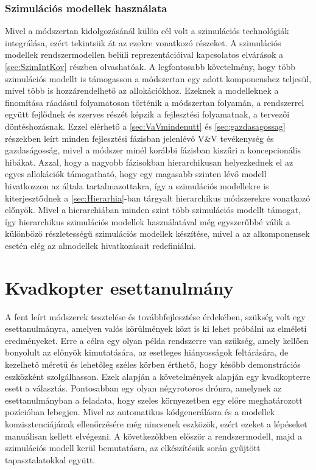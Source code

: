         \subsubsection{Szimulációs modellek használata}
        Mivel a módszertan kidolgozásánál külön cél volt a szimulációs technológiák integrálása, ezért tekintsük át az ezekre vonatkozó részeket.
        A szimulációs modellek rendszermodellen belüli reprezentációival kapcsolatos elvárások a \ref{sec:SzimIntKov} részben olvashatóak. A legfontosabb követelmény, hogy több szimulációs modellt is támogasson a módszertan egy adott komponenshez teljesül, mivel több is hozzárendelhető az allokációkhoz.
        Ezeknek a modelleknek a finomítása ráadásul folyamatosan történik a módszertan folyamán, a rendszerrel együtt fejlődnek és szerves részét képzik a fejlesztési folyamatnak, a tervezői döntéshozásnak.
        Ezzel elérhető a \ref{sec:VaVmindenutt} és \ref{sec:gazdasagossag} részekben leírt minden fejlesztési fázisban jelenlévő V\&V tevékenység és gazdaságosság, mivel a módszer minél korábbi fázisban kiszűri a koncepcionális hibákat.
        Azzal, hogy a nagyobb fázisokban hierarchikusan helyezkednek el az egyes allokációk támogatható, hogy egy magasabb szinten lévő modell hivatkozzon az általa tartalmazottakra, így a szimulációs modellekre is kiterjesztődnek a \ref{sec:Hierarhia}-ban tárgyalt hierarchikus módszerekre vonatkozó előnyök.
        Mivel a hierarchiában minden szint több szimulációs modellt támogat, így hierarchikus szimulációs modellek használatával még egyszerűbbé válik a különböző részletességű szimulációs modellek készítése, mivel a az alkomponensek esetén elég az almodellek hivatkozásait redefiniálni.

\section{Kvadkopter esettanulmány}
A fent leírt módszerek tesztelése és továbbfejlesztése érdekében, szükség volt egy esettanulmányra, amelyen valós körülmények közt is ki lehet próbálni az elméleti eredményeket.
Erre a célra egy olyan példa rendszerre van szükség, amely kellően bonyolult az előnyök kimutatására, az esetleges hiányosságok feltárására, de kezelhető méretű és lehetőleg széles körben érthető, hogy később demonstrációs eszközként szolgálhasson.
Ezek alapján a követelmények alapján egy kvadkopterre esett a választás. Pontosabban egy olyan négyrotoros drónra, amelynek az esettanulmányban a feladata, hogy szeles környezetben egy előre meghatározott pozícióban lebegjen.
Mivel az automatikus kódgenerálásra és a modellek konzisztenciájának ellenőrzésére még nincsenek eszközök, ezért ezeket a lépéseket manuálisan kellett elvégezni.
A következőkben először a rendszermodell, majd a szimulációs modell kerül bemutatásra, az elkészítésük során gyűjtött tapasztalatokkal együtt.

